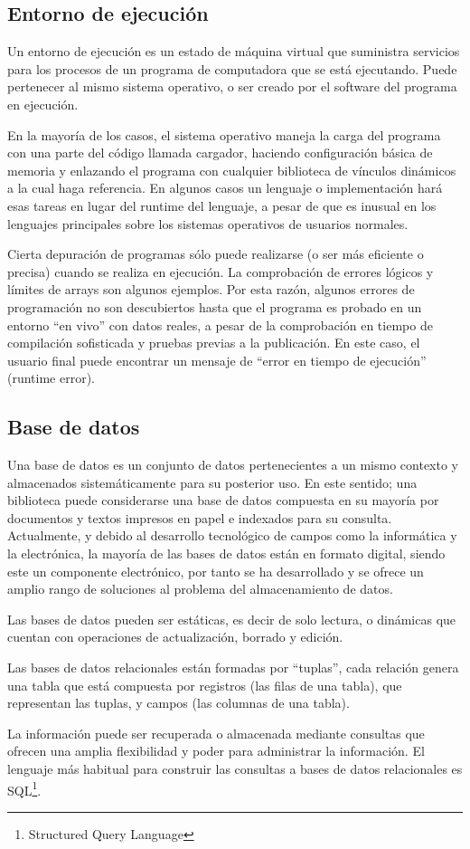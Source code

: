 \documentclass[../principal]{subfiles}
\begin{document}
  \subsection{Entorno de ejecución}

  Un entorno de ejecución es un estado de máquina virtual que suministra servicios para los procesos de un programa de computadora que se está ejecutando. Puede pertenecer al mismo sistema operativo, o ser creado por el software del programa en ejecución.
  
  En la mayoría de los casos, el sistema operativo maneja la carga del programa con una parte del código llamada cargador, haciendo configuración básica de memoria y enlazando el programa con cualquier biblioteca de vínculos dinámicos a la cual haga referencia. En algunos casos un lenguaje o implementación hará esas tareas en lugar del runtime del lenguaje, a pesar de que es inusual en los lenguajes principales sobre los sistemas operativos de usuarios normales.

  Cierta depuración de programas sólo puede realizarse (o ser más eficiente o precisa) cuando se realiza en ejecución. La comprobación de errores lógicos y límites de arrays son algunos ejemplos. Por esta razón, algunos errores de programación no son descubiertos hasta que el programa es probado en un entorno ``en vivo'' con datos reales, a pesar de la comprobación en tiempo de compilación sofisticada y pruebas previas a la publicación. En este caso, el usuario final puede encontrar un mensaje de ``error en tiempo de ejecución'' (runtime error).\cite{web:entorno_ejecucion}

  \subsection{Base de datos}

  Una base de datos es un conjunto de datos pertenecientes a un mismo contexto y almacenados sistemáticamente para su posterior uso. En este sentido; una biblioteca puede considerarse una base de datos compuesta en su mayoría por documentos y textos impresos en papel e indexados para su consulta. Actualmente, y debido al desarrollo tecnológico de campos como la informática y la electrónica, la mayoría de las bases de datos están en formato digital, siendo este un componente electrónico, por tanto se ha desarrollado y se ofrece un amplio rango de soluciones al problema del almacenamiento de datos.

  Las bases de datos pueden ser estáticas, es decir de solo lectura, o dinámicas que cuentan con operaciones de actualización, borrado y edición.

  Las bases de datos relacionales están formadas por ``tuplas'', cada relación genera una tabla que está compuesta por registros (las filas de una tabla), que representan las tuplas, y campos (las columnas de una tabla).

  La información puede ser recuperada o almacenada mediante consultas que ofrecen una amplia flexibilidad y poder para administrar la información. El lenguaje más habitual para construir las consultas a bases de datos relacionales es SQL\footnote{Structured Query Language}.\cite{web:base_de_datos}

  \bibliografia
\end{document}
